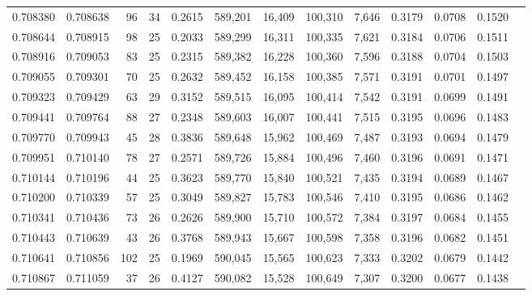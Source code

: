 \begin{tabular}{rrrrrrrrrrrrr}
0.708380 & 0.708638 &  96 &  34 &                                     0.2615 & 589,201 &  16,409 & 100,310 &   7,646 & 0.3179 & 0.0708 & 0.1520 \\
0.708644 & 0.708915 &  98 &  25 &                                     0.2033 & 589,299 &  16,311 & 100,335 &   7,621 & 0.3184 & 0.0706 & 0.1511 \\
0.708916 & 0.709053 &  83 &  25 &                                     0.2315 & 589,382 &  16,228 & 100,360 &   7,596 & 0.3188 & 0.0704 & 0.1503 \\
0.709055 & 0.709301 &  70 &  25 &                                     0.2632 & 589,452 &  16,158 & 100,385 &   7,571 & 0.3191 & 0.0701 & 0.1497 \\
0.709323 & 0.709429 &  63 &  29 &                                     0.3152 & 589,515 &  16,095 & 100,414 &   7,542 & 0.3191 & 0.0699 & 0.1491 \\
0.709441 & 0.709764 &  88 &  27 &                                     0.2348 & 589,603 &  16,007 & 100,441 &   7,515 & 0.3195 & 0.0696 & 0.1483 \\
0.709770 & 0.709943 &  45 &  28 &                                     0.3836 & 589,648 &  15,962 & 100,469 &   7,487 & 0.3193 & 0.0694 & 0.1479 \\
0.709951 & 0.710140 &  78 &  27 &                                     0.2571 & 589,726 &  15,884 & 100,496 &   7,460 & 0.3196 & 0.0691 & 0.1471 \\
0.710144 & 0.710196 &  44 &  25 &                                     0.3623 & 589,770 &  15,840 & 100,521 &   7,435 & 0.3194 & 0.0689 & 0.1467 \\
0.710200 & 0.710339 &  57 &  25 &                                     0.3049 & 589,827 &  15,783 & 100,546 &   7,410 & 0.3195 & 0.0686 & 0.1462 \\
0.710341 & 0.710436 &  73 &  26 &                                     0.2626 & 589,900 &  15,710 & 100,572 &   7,384 & 0.3197 & 0.0684 & 0.1455 \\
0.710443 & 0.710639 &  43 &  26 &                                     0.3768 & 589,943 &  15,667 & 100,598 &   7,358 & 0.3196 & 0.0682 & 0.1451 \\
0.710641 & 0.710856 & 102 &  25 &                                     0.1969 & 590,045 &  15,565 & 100,623 &   7,333 & 0.3202 & 0.0679 & 0.1442 \\
0.710867 & 0.711059 &  37 &  26 &                                     0.4127 & 590,082 &  15,528 & 100,649 &   7,307 & 0.3200 & 0.0677 & 0.1438 \\

\end{tabular}
